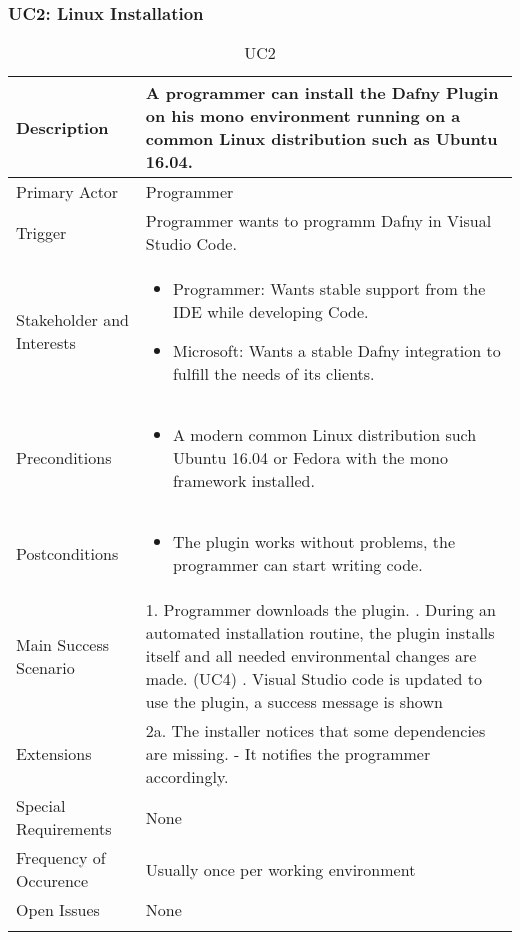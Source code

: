 \subsubsection{UC2: Linux Installation}
\begin{longtable}{l | p{} }
	Description & A programmer can install the Dafny Plugin on his mono environment running on a common Linux distribution such as Ubuntu 16.04.\\ \hline
	Primary Actor & Programmer\\ \hline
	Trigger & Programmer wants to programm Dafny in Visual Studio Code.\\ \hline
	Stakeholder and Interests & 
	\begin{itemize}
		\item Programmer: Wants stable support from the IDE while developing Code.
		\item Microsoft: Wants a stable Dafny integration to fulfill the needs of its clients.
	\end{itemize} \\ \hline
	Preconditions & 
	\begin{itemize}
		\item A modern common Linux distribution such Ubuntu 16.04 or Fedora with the mono framework installed.
	\end{itemize} \\ \hline
	Postconditions &
	\begin{itemize}
		\item The plugin works without problems, the programmer can start writing code.
	\end{itemize} \\ \hline
	Main Success Scenario & 1. Programmer downloads the plugin. \newline
	2. During an automated installation routine, the plugin installs itself and all needed environmental changes are made. (UC4) \newline
	3. Visual Studio code is updated to use the plugin, a success message is shown\\ \hline
	Extensions &
	2a. The installer notices that some dependencies are missing. \newline
	- It notifies the programmer accordingly.\\ \hline
	Special Requirements & None\\ \hline
	Frequency of Occurence & Usually once per working environment\\ \hline
	Open Issues & None \\ \hline
	\caption{UC2}
\end{longtable}

